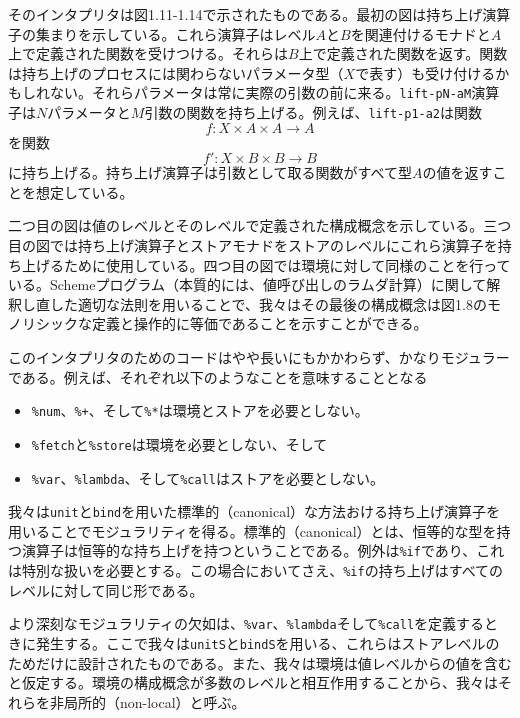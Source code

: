 \documentclass[11pt, oneside]{jsbook}   	%
\begin{document}
そのインタプリタは図1.11-1.14で示されたものである。最初の図は持ち上げ演算子の集まりを示している。これら演算子はレベル$A$と$B$を関連付けるモナドと$A$上で定義された関数を受けつける。それらは$B$上で定義された関数を返す。関数は持ち上げのプロセスには関わらないパラメータ型（$X$で表す）も受け付けるかもしれない。それらパラメータは常に実際の引数の前に来る。\verb|lift-pN-aM|演算子は$N$パラメータと$M$引数の関数を持ち上げる。例えば、\verb|lift-p1-a2|は関数
$$
f : X \times A \times A \rightarrow A
$$
を関数
$$
f' : X \times B \times B \rightarrow B
$$
に持ち上げる。持ち上げ演算子は引数として取る関数がすべて型$A$の値を返すことを想定している。

二つ目の図は値のレベルとそのレベルで定義された構成概念を示している。三つ目の図では持ち上げ演算子とストアモナドをストアのレベルにこれら演算子を持ち上げるために使用している。四つ目の図では環境に対して同様のことを行っている。Schemeプログラム（本質的には、値呼び出しのラムダ計算）に関して解釈し直した適切な法則を用いることで、我々はその最後の構成概念は図1.8のモノリシックな定義と操作的に等価であることを示すことができる。

このインタプリタのためのコードはやや長いにもかかわらず、かなりモジュラーである。例えば、それぞれ以下のようなことを意味することとなる
\begin{itemize}
\item \verb|%num|、\verb|%+|、そして\verb|%*|は環境とストアを必要としない。
\item \verb|%fetch|と\verb|%store|は環境を必要としない、そして
\item \verb|%var|、\verb|%lambda|、そして\verb|%call|はストアを必要としない。
\end{itemize}
我々は\verb|unit|と\verb|bind|を用いた標準的（canonical）な方法おける持ち上げ演算子を用いることでモジュラリティを得る。標準的（canonical）とは、恒等的な型を持つ演算子は恒等的な持ち上げを持つということである。例外は\verb|%if|であり、これは特別な扱いを必要とする。この場合においてさえ、\verb|%if|の持ち上げはすべてのレベルに対して同じ形である。

より深刻なモジュラリティの欠如は、\verb|%var|、\verb|%lambda|そして\verb|%call|を定義するときに発生する。ここで我々は\verb|unitS|と\verb|bindS|を用いる、これらはストアレベルのためだけに設計されたものである。また、我々は環境は値レベルからの値を含むと仮定する。環境の構成概念が多数のレベルと相互作用することから、我々はそれらを非局所的（non-local）と呼ぶ。
\newpage

\newpage
\end{document}
